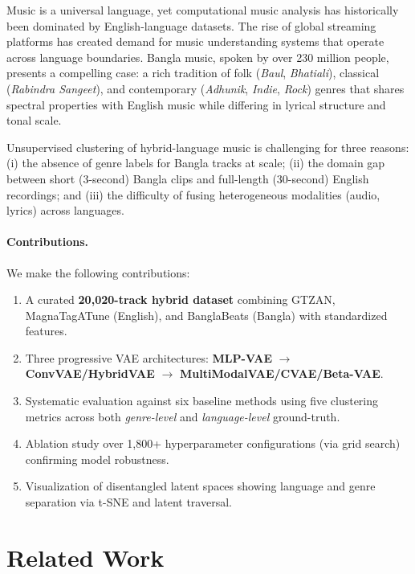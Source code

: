 \documentclass{article}
\begin{document}
Music is a universal language, yet computational music analysis has historically been dominated by English-language datasets. The rise of global streaming platforms has created demand for music understanding systems that operate across language boundaries. Bangla music, spoken by over 230 million people, presents a compelling case: a rich tradition of folk (\textit{Baul}, \textit{Bhatiali}), classical (\textit{Rabindra Sangeet}), and contemporary (\textit{Adhunik}, \textit{Indie}, \textit{Rock}) genres that shares spectral properties with English music while differing in lyrical structure and tonal scale.

Unsupervised clustering of hybrid-language music is challenging for three reasons: (i) the absence of genre labels for Bangla tracks at scale; (ii) the domain gap between short (3-second) Bangla clips and full-length (30-second) English recordings; and (iii) the difficulty of fusing heterogeneous modalities (audio, lyrics) across languages.

\paragraph{Contributions.} We make the following contributions:
\begin{enumerate}
    \item A curated \textbf{20,020-track hybrid dataset} combining GTZAN, MagnaTagATune (English), and BanglaBeats (Bangla) with standardized features.
    \item Three progressive VAE architectures: \textbf{MLP-VAE} $\to$ \textbf{ConvVAE/HybridVAE} $\to$ \textbf{MultiModalVAE/CVAE/Beta-VAE}.
    \item Systematic evaluation against six baseline methods using five clustering metrics across both \emph{genre-level} and \emph{language-level} ground-truth.
    \item Ablation study over 1,800+ hyperparameter configurations (via grid search) confirming model robustness.
    \item Visualization of disentangled latent spaces showing language and genre separation via t-SNE and latent traversal.
\end{enumerate}

\section{Related Work}
\end{document}
